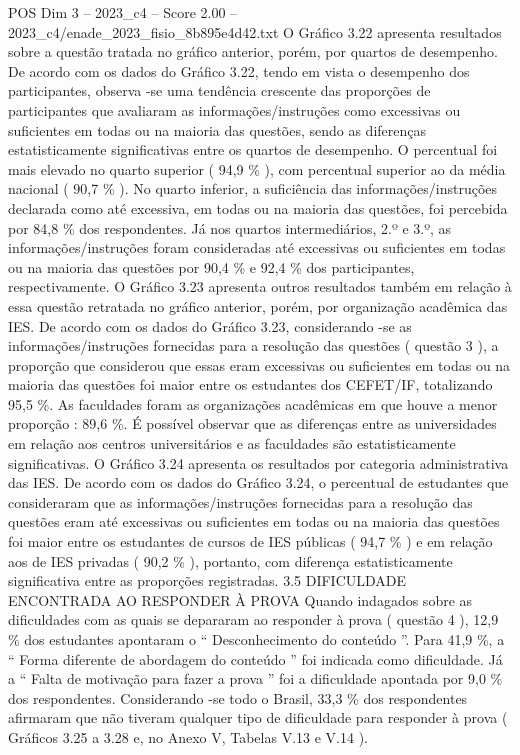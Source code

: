 \begin{textsample}{POS Dim 3 – 2023\_c4 – Score 2.00 – 2023\_c4/enade\_2023\_fisio\_8b895e4d42.txt}
O Gráfico 3.22 apresenta resultados sobre a questão tratada no gráfico anterior, porém, por quartos de desempenho.
De acordo com os dados do Gráfico 3.22, tendo em vista o desempenho dos participantes, observa -se uma tendência crescente das proporções de participantes que avaliaram as informações/instruções como excessivas ou suficientes em todas ou na maioria das questões, sendo as diferenças estatisticamente significativas entre os quartos de desempenho.
O percentual foi mais elevado no quarto superior ( 94,9 \% ), com percentual superior ao da média nacional ( 90,7 \% ).
No quarto inferior, a suficiência das informações/instruções declarada como até excessiva, em todas ou na maioria das questões, foi percebida por 84,8 \% dos respondentes.
Já nos quartos intermediários, 2.º e 3.º, as informações/instruções foram consideradas até excessivas ou suficientes em todas ou na maioria das questões por 90,4 \% e 92,4 \% dos participantes, respectivamente.
O Gráfico 3.23 apresenta outros resultados também em relação à essa questão retratada no gráfico anterior, porém, por organização acadêmica das IES.
De acordo com os dados do Gráfico 3.23, considerando -se as informações/instruções fornecidas para a resolução das questões ( questão 3 ), a proporção que considerou que essas eram excessivas ou suficientes em todas ou na maioria das questões foi maior entre os estudantes dos CEFET/IF, totalizando 95,5 \%.
As faculdades foram as organizações acadêmicas em que houve a menor proporção : 89,6 \%.
É possível observar que as diferenças entre as universidades em relação aos centros universitários e as faculdades são estatisticamente significativas.
O Gráfico 3.24 apresenta os resultados por categoria administrativa das IES.
De acordo com os dados do Gráfico 3.24, o percentual de estudantes que consideraram que as informações/instruções fornecidas para a resolução das questões eram até excessivas ou suficientes em todas ou na maioria das questões foi maior entre os estudantes de cursos de IES públicas ( 94,7 \% ) e em relação aos de IES privadas ( 90,2 \% ), portanto, com diferença estatisticamente significativa entre as proporções registradas. 3.5 DIFICULDADE ENCONTRADA AO RESPONDER À PROVA Quando indagados sobre as dificuldades com as quais se depararam ao responder à prova ( questão 4 ), 12,9 \% dos estudantes apontaram o “ Desconhecimento do conteúdo ”.
Para 41,9 \%, a “ Forma diferente de abordagem do conteúdo ” foi indicada como dificuldade.
Já a “ Falta de motivação para fazer a prova ” foi a dificuldade apontada por 9,0 \% dos respondentes.
Considerando -se todo o Brasil, 33,3 \% dos respondentes afirmaram que não tiveram qualquer tipo de dificuldade para responder à prova ( Gráficos 3.25 a 3.28 e, no Anexo V, Tabelas V.13 e V.14 ).

\end{textsample}
